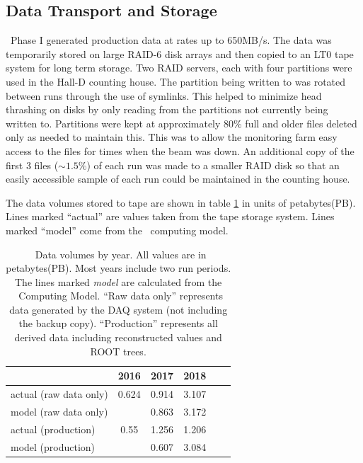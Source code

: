 \subsection{Data Transport and Storage \label{sec:onlineprocessing}}

\GX ~Phase I generated production data at rates up to 650MB/s. The data was temporarily stored on large RAID-6 disk arrays and then copied to an LT0 tape system for long term storage. Two RAID servers, each with four partitions were used in the Hall-D counting house. The partition being written to was rotated between runs through the use of symlinks. This helped to minimize head thrashing on disks by only reading from the partitions not currently being written to. Partitions were kept at approximately 80\% full and older files deleted only as needed to maintain this. This was to allow the monitoring farm easy access to the files for times when the beam was down. An additional copy of the first 3 files ($\sim1.5\%$) of each run was made to a smaller RAID disk so that an easily accessible sample of each run could be maintained in the counting house.

The data volumes stored to tape are shown in table \ref{tab:online_data_volumes} in units of petabytes(PB). Lines marked ``actual'' are values taken from the tape storage system. Lines marked ``model'' come from the \GX ~computing model\cite{gx3821}.

\begin{table}[]
    \centering
    \begin{tabular}{|l|c|c|c|c|c|}
    \hline
                           & \textbf{2016}  & \textbf{2017}  & \textbf{2018} \\
    \hline
    actual (raw data only) & 0.624 & 0.914 & 3.107 \\
    \hline
     model (raw data only) &       & 0.863 & 3.172 \\
    \hline
    \hline
    actual (production)    & 0.55  & 1.256 & 1.206 \\
    \hline
     model (production)    &       & 0.607 & 3.084 \\
    \hline
    \end{tabular}
    \caption{\GX ~Data volumes by year. All values are in petabytes(PB). Most years include two run periods. The lines marked \textit{model} are calculated from the \GX ~Computing Model\cite{gx3821}. ``Raw data only'' represents data generated by the DAQ system (not including the backup copy). ``Production'' represents all derived data including reconstructed values and ROOT trees. }
    \label{tab:online_data_volumes}
\end{table}

